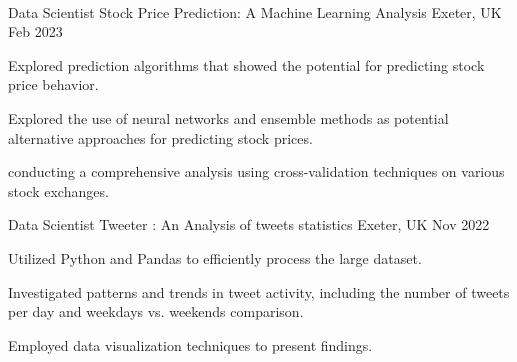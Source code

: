 \\
\begin{minipage}[t]{0.48\linewidth}
  
\begin{cventries}

  \cventry
  {Data Scientist} %
  {Stock Price Prediction: A Machine Learning Analysis} %
  {Exeter, UK} %
  {Feb 2023} %
  {
    \begin{cvitems} %
      \item {Explored prediction algorithms that showed the potential for predicting stock price behavior.}
      \item {Explored the use of neural networks and ensemble methods as potential alternative approaches for predicting stock prices.}
      \item {conducting a comprehensive analysis using cross-validation techniques on various stock exchanges.}
    \end{cvitems}
  } 
  \cventry
  {Data Scientist}
  {Tweeter : An Analysis of tweets statistics}
  {Exeter, UK}
  {Nov 2022}
  {
    \begin{cvitems}
      \item {Utilized Python and Pandas to efficiently process the large dataset.}
      \item {Investigated patterns and trends in tweet activity, including the number of tweets per day and weekdays vs. weekends comparison.}
      \item {Employed data visualization techniques to present findings.}
    \end{cvitems}
  }
  \end{cventries}
\end{minipage}
\hspace{0.04\linewidth}
